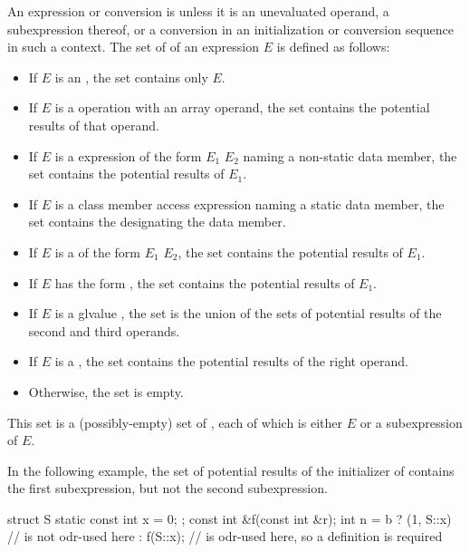 \pnum
{}%
An expression or conversion is  unless it is
an unevaluated operand,
a subexpression thereof, or
a conversion in an initialization or conversion sequence in such a context.
The set of  of an expression $E$ is
defined as follows:
\begin{itemize}
\item If $E$ is an
, the set
contains only $E$.
\item If $E$ is a  operation with
an array operand, the set contains the potential results of that operand.
\item If $E$ is a  expression of the form
$E_1$   $E_2$
naming a non-static data member,
the set contains the potential results of $E_1$.
\item If $E$ is a class member access expression
naming a static data member,
the set contains the  designating the data member.
\item If $E$ is a  of the form
$E_1$  $E_2$,
the set contains the potential results of $E_1$.
\item If $E$ has the form , the set contains the
potential results of $E_1$.
\item If $E$ is a glvalue ,
the set is the union of the sets of
potential results of the second and third operands.
\item If $E$ is a , the set
contains the potential results of the right operand.
\item Otherwise, the set is empty.
\end{itemize}
\begin{note}
This set is a (possibly-empty) set of ,
each of which is either $E$ or a subexpression of $E$.
\begin{example}
In the following example, the set of potential results of the initializer
of  contains the first  subexpression, but not the second
 subexpression.
\begin{codeblock}
struct S { static const int x = 0; };
const int &f(const int &r);
int n = b ? (1, S::x)           //  is not odr-used here
          : f(S::x);            //  is odr-used here, so a definition is required
\end{codeblock}
\end{example}
\end{note}

